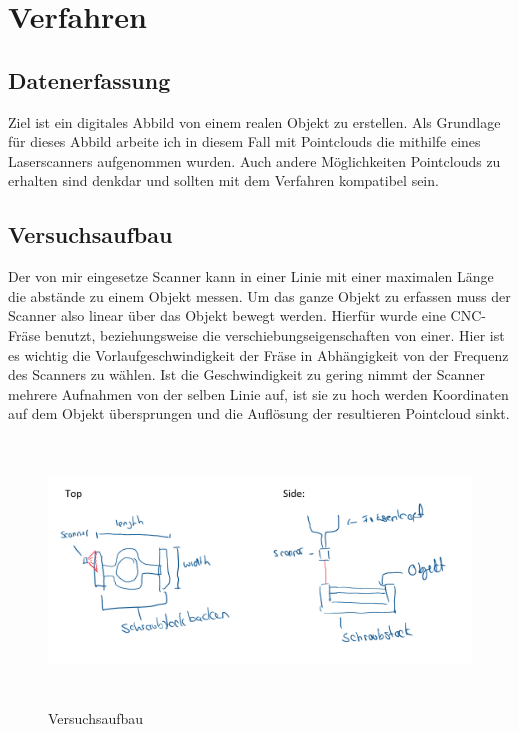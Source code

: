 \documentclass[../main.tex]{subfiles}
\begin{document}
\section{Verfahren}

\subsection{Datenerfassung}
Ziel ist ein digitales Abbild von einem realen Objekt zu erstellen.
Als Grundlage für dieses Abbild arbeite ich in diesem Fall mit Pointclouds 
die mithilfe eines Laserscanners aufgenommen wurden. Auch andere Möglichkeiten
Pointclouds zu erhalten sind denkdar und sollten mit dem Verfahren 
kompatibel sein.

\subsection{Versuchsaufbau}
Der von mir eingesetze Scanner kann in einer Linie mit einer maximalen Länge 
die abstände zu einem Objekt messen.
Um das ganze Objekt zu erfassen muss der Scanner also linear über das Objekt 
bewegt werden. 
Hierfür wurde eine CNC-Fräse benutzt, beziehungsweise die 
verschiebungseigenschaften von einer.
Hier ist es wichtig die Vorlaufgeschwindigkeit der Fräse in Abhängigkeit von der
Frequenz des Scanners zu wählen. 
Ist die Geschwindigkeit zu gering nimmt der Scanner mehrere Aufnahmen von der
selben Linie auf, ist sie zu hoch werden Koordinaten auf dem Objekt übersprungen
und die Auflösung der resultieren Pointcloud sinkt.
\begin{figure}[h]
    \centering
    \includegraphics[height=200pt]{images/versuchsaufbau_sketch.PNG}
    \caption{Versuchsaufbau}
    \label{fig:versuchsaufbau}
\end{figure}
\end{document}
